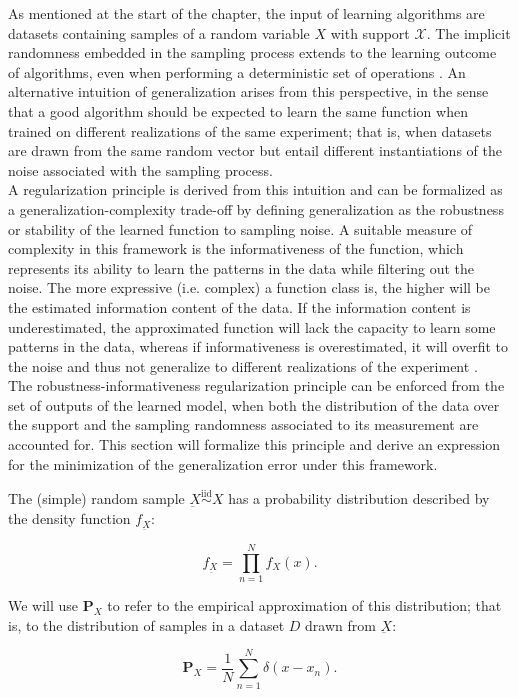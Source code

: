 As mentioned at the start of the chapter, the input of learning algorithms are
datasets containing samples of a random variable $X$ with support $\mathcal{X}$. The implicit randomness embedded 
in the sampling process extends to the learning outcome of algorithms,
even when performing a deterministic set of operations
\cite{buhmannDataScienceAlgorithms2022}. 
An alternative intuition of 
generalization arises from this perspective, in the sense that a good algorithm should be
expected to learn the same function when trained on different realizations 
of the same experiment; that is, when datasets are drawn from the same random vector 
but entail different instantiations of the noise associated with the sampling process. \\

A regularization principle is derived from this intuition and can be formalized as a
generalization-complexity trade-off by defining generalization as the robustness or stability
of the learned function to sampling noise. A suitable measure of complexity in this framework
is the informativeness of the function, which represents its ability to learn the patterns in the
data while filtering out the noise. The more expressive (i.e. complex) a function class is,
the higher will be the estimated information content of the data. If the information content is
underestimated, the approximated function will lack the capacity to learn some patterns in
the data, whereas if informativeness is overestimated, it will overfit to the noise and 
thus not generalize to different realizations of the experiment
\cite{chehreghaniInformationTheoreticModel,buhmannInformationTheoreticModel,buhmannInformationTheoreticModel2010}. \\

The robustness-informativeness regularization principle can be enforced from the set 
of outputs of the learned model, when both the distribution of the data over the support 
and the sampling randomness associated to its measurement are accounted for. This section 
will formalize this principle and derive an expression for the minimization of
the generalization error under this framework.

\begin{definition}
    The (simple) random sample $\underbar{X} \overset{\text{iid}}{\sim} X$ has a probability distribution
    described by the density function $f_{\underbar{X}}$:

    $$
     f_{\underbar{X}} = \prod_{n=1}^{N} f_{X}(x).
    $$

    We will use $\mathbf{P}_{X}$ to refer to the empirical approximation of this distribution; 
    that is, to the distribution of samples in a dataset $D$ drawn from $\underbar{X}$:

    $$
    \mathbf{P}_{X} = \frac{1}{N} \sum_{n=1}^{N} \delta(x - x_n).
    $$

\end{definition}

